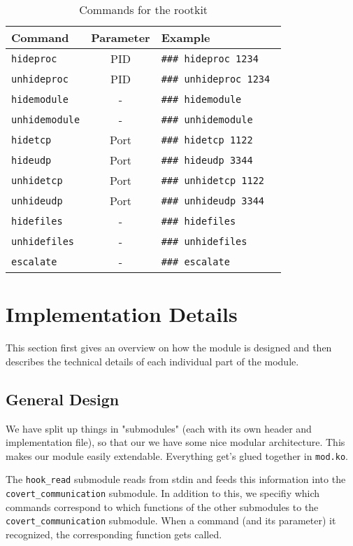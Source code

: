\documentclass[10pt, letterpaper]{article}
\begin{document}
\begin{table}[th]
\centering
\begin{tabular}{lcl}
Command & Parameter & Example \\
\hline
\texttt{hideproc} & PID & \texttt{\#\#\# hideproc 1234 } \\
\texttt{unhideproc} & PID & \texttt{\#\#\# unhideproc 1234 } \\
\texttt{hidemodule} & - & \texttt{\#\#\# hidemodule } \\
\texttt{unhidemodule} & - & \texttt{\#\#\# unhidemodule } \\
\texttt{hidetcp} & Port & \texttt{\#\#\# hidetcp 1122 } \\
\texttt{hideudp} & Port & \texttt{\#\#\# hideudp 3344 } \\
\texttt{unhidetcp} & Port & \texttt{\#\#\# unhidetcp 1122 } \\
\texttt{unhideudp} & Port & \texttt{\#\#\# unhideudp 3344 } \\
\texttt{hidefiles} & - & \texttt{\#\#\# hidefiles } \\
\texttt{unhidefiles} & - & \texttt{\#\#\# unhidefiles } \\
\texttt{escalate} & -  & \texttt{\#\#\# escalate } \\
\end{tabular}
\caption{Commands for the rootkit}
\label{tab:rootkit-commands}
\end{table}

\section{Implementation Details}
This section first gives an overview on how the module is designed and then describes the technical details of each individual part of the module.
\subsection{General Design}
We have split up things in "submodules" (each with its own header and implementation file), so
that our we have some nice modular architecture. This makes our module easily extendable. Everything get's glued together in \texttt{mod.ko}.

The \texttt{hook\_read} submodule reads from stdin and feeds this information into the \linebreak \texttt{covert\_communication} submodule. In addition to this, we specifiy which commands correspond to which functions of the other submodules to the  \texttt{covert\_communication} submodule. When a command (and its parameter) it recognized, the corresponding function gets called.
\end{document}
